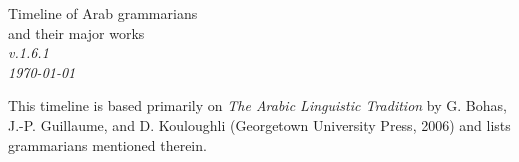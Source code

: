 \documentclass[a4paper,landscape]{article}
\begin{document}
\thispagestyle{empty}

\begin{minipage}[t]{.4\textwidth}
{\LARGE Timeline of Arab grammarians\\and their major works}\\[\medskipamount]
\textit{v.1.6.1\\\today}
\end{minipage}
\hfill
\begin{minipage}[t]{7cm}
  \setlength{\parfillskip}{0pt}
This timeline is based primarily on \textit{The Arabic Linguistic Tradition} by G. Bohas, \mbox{J.-P.} Guillaume, and D. Kouloughli (Georgetown University Press, 2006) and lists grammarians mentioned therein.
\end{minipage}


\vfill
\end{document}
